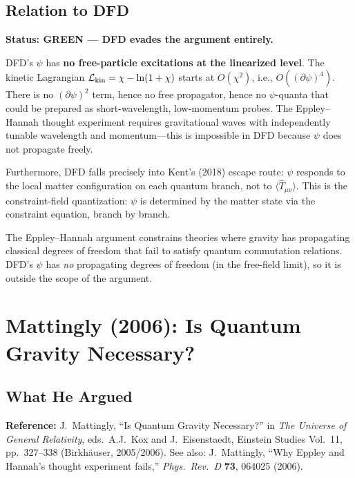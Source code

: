 \documentclass[12pt,a4paper]{article}
\newcommand{\GREEN}{\textcolor{dfdgreen}{\textbf{GREEN}}}
\begin{document}
\subsection{Relation to DFD}

\textbf{Status: \GREEN{} --- DFD evades the argument entirely.}

DFD's $\psi$ has \textbf{no free-particle excitations at the linearized level}. The kinetic Lagrangian $\mathcal{L}_{\rm kin} = \chi - \ln(1+\chi)$ starts at $O(\chi^2)$, i.e., $O((\partial\psi)^4)$. There is no $(\partial\psi)^2$ term, hence no free propagator, hence no $\psi$-quanta that could be prepared as short-wavelength, low-momentum probes. The Eppley--Hannah thought experiment requires gravitational waves with independently tunable wavelength and momentum---this is impossible in DFD because $\psi$ does not propagate freely.

Furthermore, DFD falls precisely into Kent's (2018) escape route: $\psi$ responds to the local matter configuration on each quantum branch, not to $\langle\hat{T}_{\mu\nu}\rangle$. This is the constraint-field quantization: $\psi$ is determined by the matter state via the constraint equation, branch by branch.

The Eppley--Hannah argument constrains theories where gravity has propagating classical degrees of freedom that fail to satisfy quantum commutation relations. DFD's $\psi$ has \emph{no} propagating degrees of freedom (in the free-field limit), so it is outside the scope of the argument.


\section{Mattingly (2006): Is Quantum Gravity Necessary?}
\label{sec:mattingly}

\subsection{What He Argued}

\textbf{Reference:} J.\ Mattingly, ``Is Quantum Gravity Necessary?'' in \textit{The Universe of General Relativity}, eds.\ A.J.\ Kox and J.\ Eisenstaedt, Einstein Studies Vol.\ 11, pp.\ 327--338 (Birkh\"auser, 2005/2006). See also: J.\ Mattingly, ``Why Eppley and Hannah's thought experiment fails,'' \textit{Phys.\ Rev.\ D} \textbf{73}, 064025 (2006).
\end{document}
